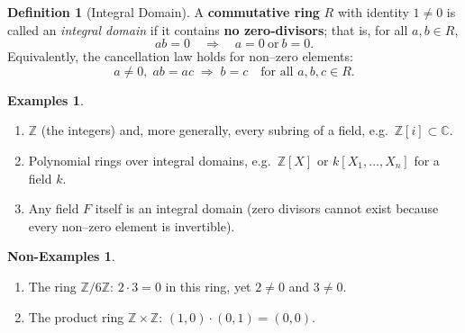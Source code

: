 \documentclass[12pt]{article}
\title{}
\author{Jerich Lee}
\date{\today}
\theoremstyle{definition} %
\newtheorem{definition}{Definition}
\newtheorem{examples}{Examples}
\newtheorem{nonexamples}{Non-Examples}
\theoremstyle{plain} %
\begin{document}
\maketitle
\begin{definition}[Integral Domain]
  A \textbf{commutative ring} \(R\) with identity \(1\neq 0\) is called an
  \emph{integral domain} if it contains \textbf{no zero‐divisors}; that is,
  for all \(a,b\in R\),
  \[
     ab = 0 \quad\Longrightarrow\quad a = 0 \ \text{or}\ b = 0.
  \]
  Equivalently, the cancellation law holds for non–zero elements:
  \[
     a\neq 0,\; ab = ac \;\Longrightarrow\; b = c
     \quad\text{for all }a,b,c\in R.
  \]
  \end{definition}
  
  \begin{examples}
     \begin{enumerate}
        \item \(\mathbb{Z}\) (the integers) and, more generally, every
              subring of a field, e.g.\ \(\mathbb{Z}[i]\subset \mathbb{C}\).
        \item Polynomial rings over integral domains, e.g.\
              \(\mathbb{Z}[X]\) or \(k[X_1,\dots,X_n]\) for a field \(k\).
        \item Any field \(F\) itself is an integral domain
              (zero divisors cannot exist because every non–zero element is
              invertible).
     \end{enumerate}
  \end{examples}
  
  \begin{nonexamples}
     \begin{enumerate}
        \item The ring \(\mathbb{Z}/6\mathbb{Z}\):
              \(2\cdot 3 = 0\) in this ring, yet \(2\neq 0\) and \(3\neq 0\).
        \item The product ring \(\mathbb{Z}\times\mathbb{Z}\):
              \((1,0)\cdot(0,1) = (0,0)\).
     \end{enumerate}
  \end{nonexamples}
  
\end{document}
